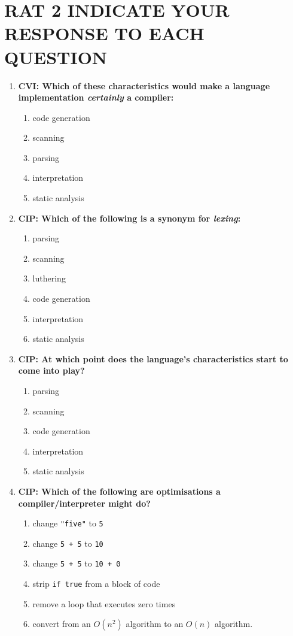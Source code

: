 \documentclass[twoside=false, DIV=14]{scrartcl}
\begin{document}
\newpage
\part*{RAT 2 \hspace{6em} {\small INDICATE YOUR RESPONSE TO EACH QUESTION}}
\renewcommand{\labelenumii}{\alph{enumii}) $\square$}
\begin{enumerate}
\item \textbf{CVI: Which of these characteristics would make a language implementation \emph{certainly} a compiler:}
\begin{enumerate}
  \item code generation \tick
  \item scanning
  \item parsing
  \item interpretation
  \item static analysis
\end{enumerate}

\item \textbf{CIP: Which of the following is a synonym for \emph{lexing}:}
\begin{enumerate}
  \item parsing
  \item scanning \tick
  \item luthering
  \item code generation
  \item interpretation
  \item static analysis
\end{enumerate}

\item \textbf{CIP: At which point does the language's characteristics start to come into play?}
\begin{enumerate}
  \item parsing
  \item scanning
  \item code generation
  \item interpretation
  \item static analysis \tick
\end{enumerate}

\item \textbf{CIP: Which of the following are optimisations a compiler/interpreter might do?}
\begin{enumerate}
  \item change \lstinline|"five"| to \lstinline|5|
  \item change \lstinline|5 + 5| to \lstinline|10| \tick
  \item change \lstinline|5 + 5| to \lstinline|10 + 0|
  \item strip \lstinline|if true| from a block of code \tick
  \item remove a loop that executes zero times \tick
  \item convert from an $O(n^2)$ algorithm to an $O(n)$ algorithm.
\end{enumerate}


\end{enumerate}
\end{document}
